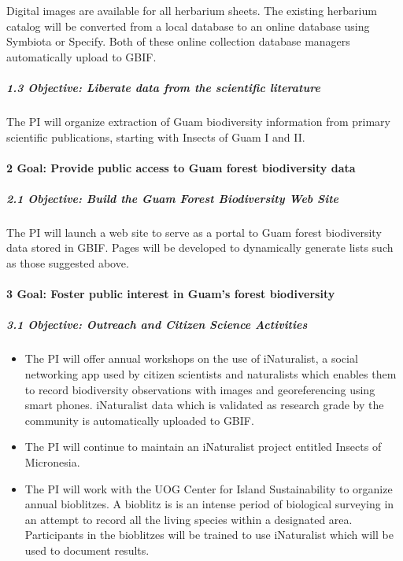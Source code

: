 \documentclass[
]{article}
\providecommand{\tightlist}{%
  \setlength{\itemsep}{0pt}\setlength{\parskip}{0pt}}
\begin{document}
Digital images are available for all herbarium sheets. The existing
herbarium catalog will be converted from a local database to an online
database using Symbiota or Specify. Both of these online collection
database managers automatically upload to GBIF.

\hypertarget{objective-liberate-data-from-the-scientific-literature}{%
\subparagraph{1.3 Objective: Liberate data from the scientific
literature}\label{objective-liberate-data-from-the-scientific-literature}}

The PI will organize extraction of Guam biodiversity information from
primary scientific publications, starting with Insects of Guam I and II.

\hypertarget{goal-provide-public-access-to-guam-forest-biodiversity-data}{%
\paragraph{2 Goal: Provide public access to Guam forest biodiversity
data}\label{goal-provide-public-access-to-guam-forest-biodiversity-data}}

\hypertarget{objective-build-the-guam-forest-biodiversity-web-site}{%
\subparagraph{2.1 Objective: Build the Guam Forest Biodiversity Web
Site}\label{objective-build-the-guam-forest-biodiversity-web-site}}

The PI will launch a web site to serve as a portal to Guam forest
biodiversity data stored in GBIF. Pages will be developed to dynamically
generate lists such as those suggested above.

\hypertarget{goal-foster-public-interest-in-guams-forest-biodiversity}{%
\paragraph{3 Goal: Foster public interest in Guam's forest
biodiversity}\label{goal-foster-public-interest-in-guams-forest-biodiversity}}

\hypertarget{objective-outreach-and-citizen-science-activities}{%
\subparagraph{3.1 Objective: Outreach and Citizen Science
Activities}\label{objective-outreach-and-citizen-science-activities}}

\begin{itemize}
\tightlist
\item
  The PI will offer annual workshops on the use of iNaturalist, a social
  networking app used by citizen scientists and naturalists which
  enables them to record biodiversity observations with images and
  georeferencing using smart phones. iNaturalist data which is validated
  as research grade by the community is automatically uploaded to GBIF.
\item
  The PI will continue to maintain an iNaturalist project entitled
  Insects of Micronesia.
\item
  The PI will work with the UOG Center for Island Sustainability to
  organize annual bioblitzes. A bioblitz is is an intense period of
  biological surveying in an attempt to record all the living species
  within a designated area. Participants in the bioblitzes will be
  trained to use iNaturalist which will be used to document results.
\end{itemize}
\end{document}
